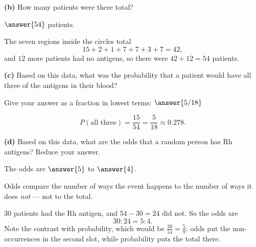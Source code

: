 \documentclass[12pt]{ximera}
\begin{document}
\begin{problem}
\begin{prompt}
\textbf{(b)} How many patients were there total?

$\answer{54}$ patients.

\begin{feedback}
The seven regions inside the circles total
\[ 15+2+1+7+7+3+7=42, \]
and $12$ more patients had no antigens, so there were $42+12=54$ patients.
\end{feedback}
\end{prompt}

\begin{prompt}
\textbf{(c)} Based on this data, what was the probability that a patient would have
all three of the antigens in their blood?

Give your answer as a fraction in lowest terms: $\answer{5/18}$

\begin{feedback}
\[
P(\text{all three})=\frac{15}{54}=\frac{5}{18}\approx 0.278.
\]
\end{feedback}
\end{prompt}

\begin{prompt}
\textbf{(d)} Based on this data, what are the odds that a random person has Rh
antigens? Reduce your answer.

The odds are $\answer{5}$ to $\answer{4}$.

\begin{hint}
Odds compare the number of ways the event happens to the number of ways it does
\emph{not} --- not to the total.
\end{hint}

\begin{feedback}
$30$ patients had the Rh antigen, and $54-30=24$ did not. So the odds are
\[ 30:24 = 5:4. \]
Note the contrast with probability, which would be $\frac{30}{54}=\frac{5}{9}$: odds
put the non-occurrences in the second slot, while probability puts the total there.
\end{feedback}
\end{prompt}
\end{problem}
\end{document}
